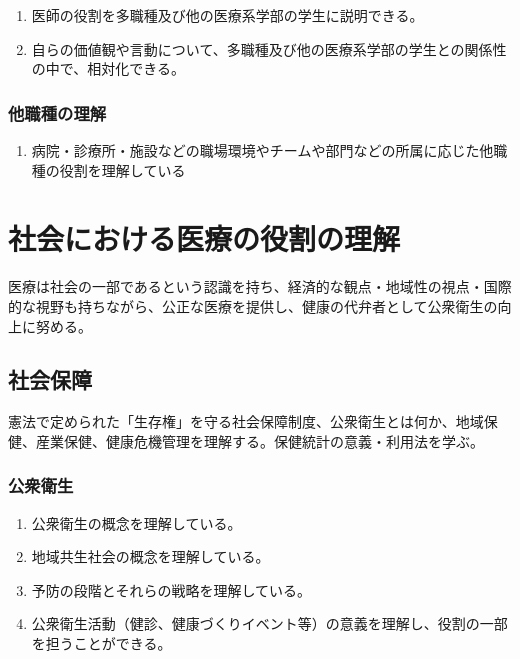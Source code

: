 \begin{enumerate}
\def\labelenumi{\arabic{enumi}.}
\tightlist
\item
  医師の役割を多職種及び他の医療系学部の学生に説明できる。
\item
  自らの価値観や言動について、多職種及び他の医療系学部の学生との関係性の中で、相対化できる。
\end{enumerate}

\hypertarget{ux4ed6ux8077ux7a2eux306eux7406ux89e3}{%
\subsubsection{他職種の理解}\label{ux4ed6ux8077ux7a2eux306eux7406ux89e3}}

\begin{enumerate}
\def\labelenumi{\arabic{enumi}.}
\tightlist
\item
  病院・診療所・施設などの職場環境やチームや部門などの所属に応じた他職種の役割を理解している
\end{enumerate}

\newpage

\hypertarget{ux793eux4f1aux306bux304aux3051ux308bux533bux7642ux306eux5f79ux5272ux306eux7406ux89e3}{%
\section{社会における医療の役割の理解}\label{ux793eux4f1aux306bux304aux3051ux308bux533bux7642ux306eux5f79ux5272ux306eux7406ux89e3}}

医療は社会の一部であるという認識を持ち、経済的な観点・地域性の視点・国際的な視野も持ちながら、公正な医療を提供し、健康の代弁者として公衆衛生の向上に努める。

\hypertarget{ux793eux4f1aux4fddux969c}{%
\subsection{社会保障}\label{ux793eux4f1aux4fddux969c}}

憲法で定められた「生存権」を守る社会保障制度、公衆衛生とは何か、地域保健、産業保健、健康危機管理を理解する。保健統計の意義・利用法を学ぶ。

\hypertarget{ux516cux8846ux885bux751f}{%
\subsubsection{公衆衛生}\label{ux516cux8846ux885bux751f}}

\begin{enumerate}
\def\labelenumi{\arabic{enumi}.}
\tightlist
\item
  公衆衛生の概念を理解している。
\item
  地域共生社会の概念を理解している。
\item
  予防の段階とそれらの戦略を理解している。
\item
  公衆衛生活動（健診、健康づくりイベント等）の意義を理解し、役割の一部を担うことができる。
\end{enumerate}

